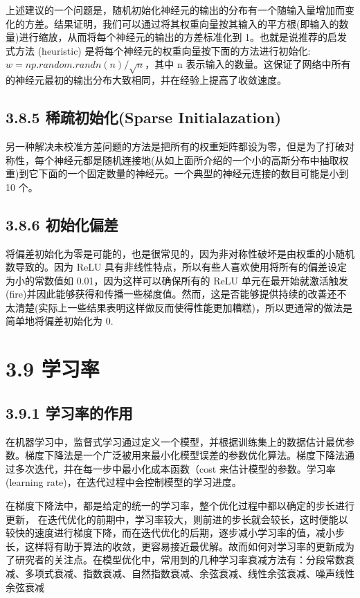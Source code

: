 ​
上述建议的一个问题是，随机初始化神经元的输出的分布有一个随输入量增加而变化的方差。结果证明，我们可以通过将其权重向量按其输入的平方根(即输入的数量)进行缩放，从而将每个神经元的输出的方差标准化到
1。也就是说推荐的启发式方法 (heuristic)
是将每个神经元的权重向量按下面的方法进行初始化: $
w=np.random.randn(n)/\sqrt n $，其中 n
表示输入的数量。这保证了网络中所有的神经元最初的输出分布大致相同，并在经验上提高了收敛速度。

\subsection{3.8.5 稀疏初始化(Sparse
Initialazation)}\label{ux7a00ux758fux521dux59cbux5316sparse-initialazation}

​
另一种解决未校准方差问题的方法是把所有的权重矩阵都设为零，但是为了打破对称性，每个神经元都是随机连接地(从如上面所介绍的一个小的高斯分布中抽取权重)到它下面的一个固定数量的神经元。一个典型的神经元连接的数目可能是小到
10 个。

\subsection{3.8.6 初始化偏差}\label{ux521dux59cbux5316ux504fux5dee}

​
将偏差初始化为零是可能的，也是很常见的，因为非对称性破坏是由权重的小随机数导致的。因为
ReLU 具有非线性特点，所以有些人喜欢使用将所有的偏差设定为小的常数值如
0.01，因为这样可以确保所有的 ReLU
单元在最开始就激活触发(fire)并因此能够获得和传播一些梯度值。然而，这是否能够提供持续的改善还不太清楚(实际上一些结果表明这样做反而使得性能更加糟糕)，所以更通常的做法是简单地将偏差初始化为
0.

\section{3.9 学习率}\label{ux5b66ux4e60ux7387}

\subsection{3.9.1
学习率的作用}\label{ux5b66ux4e60ux7387ux7684ux4f5cux7528}

​
在机器学习中，监督式学习通过定义一个模型，并根据训练集上的数据估计最优参数。梯度下降法是一个广泛被用来最小化模型误差的参数优化算法。梯度下降法通过多次迭代，并在每一步中最小化成本函数（cost
来估计模型的参数。学习率 (learning
rate)，在迭代过程中会控制模型的学习进度。

​
在梯度下降法中，都是给定的统一的学习率，整个优化过程中都以确定的步长进行更新，
在迭代优化的前期中，学习率较大，则前进的步长就会较长，这时便能以较快的速度进行梯度下降，而在迭代优化的后期，逐步减小学习率的值，减小步长，这样将有助于算法的收敛，更容易接近最优解。故而如何对学习率的更新成为了研究者的关注点。
​
在模型优化中，常用到的几种学习率衰减方法有：分段常数衰减、多项式衰减、指数衰减、自然指数衰减、余弦衰减、线性余弦衰减、噪声线性余弦衰减

